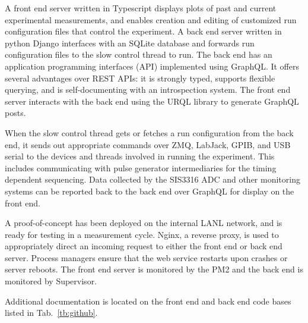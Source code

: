 A front end server written in Typescript displays plots of past and current experimental measurements, and enables creation and editing of customized run configuration files that control the experiment. A back end server written in python Django interfaces with an SQLite database and forwards run configuration files to the slow control thread to run. The back end has an application programming interfaces (API) implemented using GraphQL. It offers several advantages over REST APIs: it is strongly typed, supports flexible querying, and is self-documenting with an introspection system. The front end server interacts with the back end using the URQL library to generate GraphQL posts.

When the slow control thread gets or fetches a run configuration from the back end, it sends out appropriate commands over ZMQ, LabJack, GPIB, and USB serial to the devices and threads involved in running the experiment. This includes communicating with pulse generator intermediaries for the timing dependent sequencing. Data collected by the SIS3316 ADC and other monitoring systems can be reported back to the back end over GraphQL for display on the front end.

A proof-of-concept has been deployed on the internal LANL network, and is ready for testing in a measurement cycle. Nginx, a reverse proxy, is used to appropriately direct an incoming request to either the front end or back end server. Process managers ensure that the web service restarts upon crashes or server reboots. The front end server is monitored by the PM2 and the back end is monitored by Supervisor.

Additional documentation is located on the front end and back end code bases listed in Tab.~\ref{tb:github}.